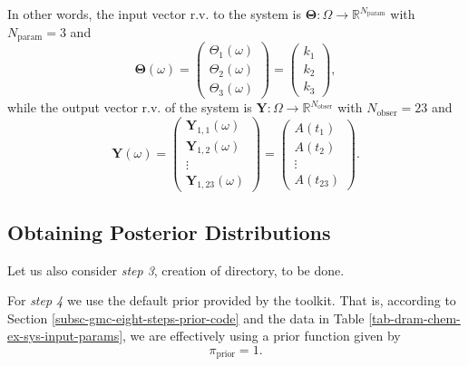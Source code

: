 In other words, the input vector r.v. to the system is $\boldsymbol{\Theta}:\Omega\rightarrow\mathbb{R}^{N_{\text{param}}}$ with $N_{\text{param}}=3$ and
\begin{equation*}
\boldsymbol{\Theta}(\omega)
= 
\left(
\begin{array}{c}
\Theta_1(\omega) \\
\Theta_2(\omega) \\
\Theta_3(\omega)
\end{array}
\right)
= 
\left(
\begin{array}{c}
k_1 \\
k_2 \\
k_3
\end{array}
\right),
\end{equation*}
while the output vector r.v. of the system is $\mathbf{Y}:\Omega\rightarrow\mathbb{R}^{N_{\text{obser}}}$ with $N_{\text{obser}}=23$ and
\begin{equation*}
\mathbf{Y}(\omega)
= 
\left(
\begin{array}{c}
\mathbf{Y}_{1,1}(\omega) \\
\mathbf{Y}_{1,2}(\omega) \\
\vdots                   \\
\mathbf{Y}_{1,23}(\omega)
\end{array}
\right)
= 
\left(
\begin{array}{c}
A(t_1) \\
A(t_2) \\
\vdots \\
A(t_23)
\end{array}
\right).
\end{equation*}

\clearpage
\subsection{Obtaining Posterior Distributions}

Let us also consider {\it step 3}, creation of directory, to be done.

For {\it step 4}
we use the default prior provided by the toolkit.
That is, according to Section \ref{subsc-gmc-eight-steps-prior-code}
and the data in Table \ref{tab-dram-chem-ex-sys-input-params}, we are effectively using a prior function given by
\begin{equation*}
\pi_{\text{prior}} = 1.
\end{equation*}

